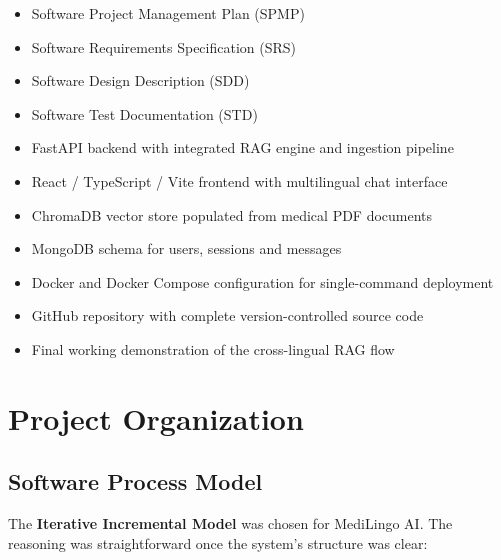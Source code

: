 \begin{itemize}
  \item Software Project Management Plan (SPMP)
  \item Software Requirements Specification (SRS)
  \item Software Design Description (SDD)
  \item Software Test Documentation (STD)
  \item FastAPI backend with integrated RAG engine and ingestion pipeline
  \item React / TypeScript / Vite frontend with multilingual chat interface
  \item ChromaDB vector store populated from medical PDF documents
  \item MongoDB schema for users, sessions and messages
  \item Docker and Docker Compose configuration for single-command deployment
  \item GitHub repository with complete version-controlled source code
  \item Final working demonstration of the cross-lingual RAG flow
\end{itemize}

\section{Project Organization}

\subsection{Software Process Model}

The \textbf{Iterative Incremental Model} was chosen for MediLingo AI. The reasoning was
straightforward once the system's structure was clear:

